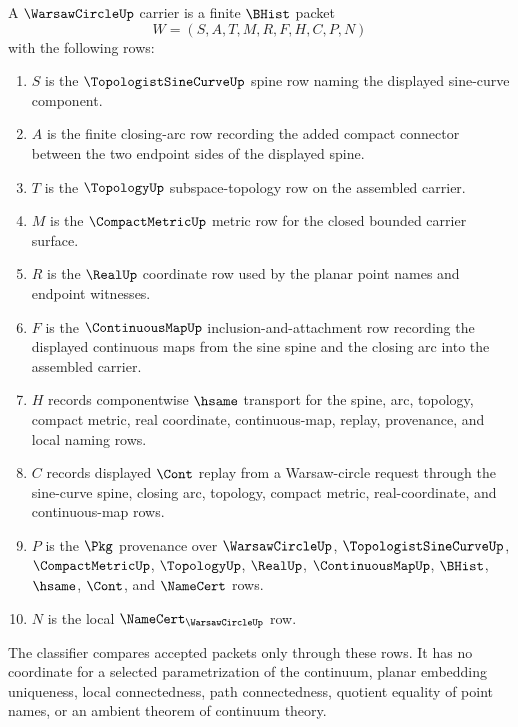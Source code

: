 \begin{definition}
\label{def:warsaw-circle-carrier}
A $\WarsawCircleUp$ carrier is a finite $\BHist$ packet
$$
W=(S,A,T,M,R,F,H,C,P,N)
$$
with the following rows:
\begin{enumerate}
\item $S$ is the $\TopologistSineCurveUp$ spine row naming the displayed sine-curve component.
\item $A$ is the finite closing-arc row recording the added compact connector between the two endpoint sides of the displayed spine.
\item $T$ is the $\TopologyUp$ subspace-topology row on the assembled carrier.
\item $M$ is the $\CompactMetricUp$ metric row for the closed bounded carrier surface.
\item $R$ is the $\RealUp$ coordinate row used by the planar point names and endpoint witnesses.
\item $F$ is the $\ContinuousMapUp$ inclusion-and-attachment row recording the displayed continuous maps from the sine spine and the closing arc into the assembled carrier.
\item $H$ records componentwise $\hsame$ transport for the spine, arc, topology, compact metric, real coordinate, continuous-map, replay, provenance, and local naming rows.
\item $C$ records displayed $\Cont$ replay from a Warsaw-circle request through the sine-curve spine, closing arc, topology, compact metric, real-coordinate, and continuous-map rows.
\item $P$ is the $\Pkg$ provenance over $\WarsawCircleUp$, $\TopologistSineCurveUp$, $\CompactMetricUp$, $\TopologyUp$, $\RealUp$, $\ContinuousMapUp$, $\BHist$, $\hsame$, $\Cont$, and $\NameCert$ rows.
\item $N$ is the local $\NameCert_{\WarsawCircleUp}$ row.
\end{enumerate}
The classifier compares accepted packets only through these rows. It has no coordinate for a selected parametrization of the continuum, planar embedding uniqueness, local connectedness, path connectedness, quotient equality of point names, or an ambient theorem of continuum theory.
\end{definition}

